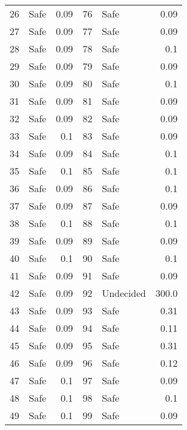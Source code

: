 \begin{table}[!ht]
\begin{tabular}{|llr|llr|}
    26 & Safe & 0.09 &    76 & Safe & 0.09\\ 
    27 & Safe & 0.09 &    77 & Safe & 0.09\\ 
    28 & Safe & 0.09 &    78 & Safe & 0.1\\ 
    29 & Safe & 0.09 &    79 & Safe & 0.09\\ 
    30 & Safe & 0.09 &    80 & Safe & 0.1\\ 
    31 & Safe & 0.09 &    81 & Safe & 0.09\\ 
    32 & Safe & 0.09 &    82 & Safe & 0.09\\ 
    33 & Safe & 0.1 &    83 & Safe & 0.09\\ 
    34 & Safe & 0.09 &    84 & Safe & 0.1\\ 
    35 & Safe & 0.1 &    85 & Safe & 0.1\\ 
    36 & Safe & 0.09 &    86 & Safe & 0.1\\ 
    37 & Safe & 0.09 &    87 & Safe & 0.09\\ 
    38 & Safe & 0.1 &    88 & Safe & 0.1\\ 
    39 & Safe & 0.09 &    89 & Safe & 0.09\\ 
    40 & Safe & 0.1 &    90 & Safe & 0.1\\ 
    41 & Safe & 0.09 &    91 & Safe & 0.09\\ 
    42 & Safe & 0.09 &    92 & Undecided & 300.0\\ 
    43 & Safe & 0.09 &    93 & Safe & 0.31\\ 
    44 & Safe & 0.09 &    94 & Safe & 0.11\\ 
    45 & Safe & 0.09 &    95 & Safe & 0.31\\ 
    46 & Safe & 0.09 &    96 & Safe & 0.12\\ 
    47 & Safe & 0.1 &    97 & Safe & 0.09\\ 
    48 & Safe & 0.1 &    98 & Safe & 0.1\\ 
    49 & Safe & 0.1 &    99 & Safe & 0.09\\ 
    \bottomrule
  \end{tabular}
\end{table}


